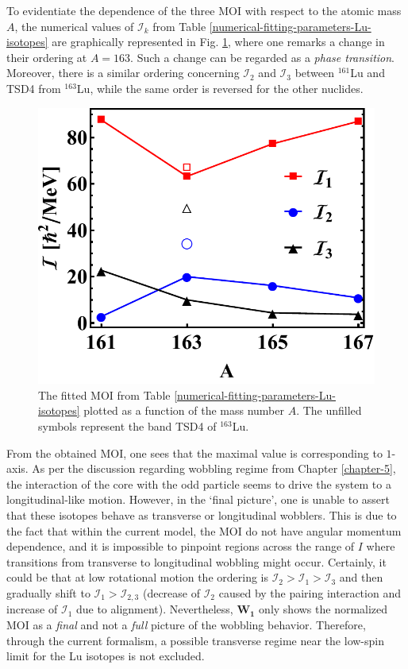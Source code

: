 To evidentiate the dependence of the three MOI with respect to the atomic mass $A$, the numerical values of $\mathcal{I}_k$ from Table \ref{numerical-fitting-parameters-Lu-isotopes} are graphically represented in Fig. \ref{MOIs-A-behavior-Lu-isotopes}, where one remarks a change in their ordering at $A=163$. Such a change can be regarded as a \emph{phase transition}. Moreover, there is a similar ordering concerning $\mathcal{I}_2$ and $\mathcal{I}_3$ between $^{161}$Lu and TSD4 from $^{163}$Lu, while the same order is reversed for the other nuclides.
\begin{figure}
    \centering
    \includegraphics[scale=0.65]{Chapters/Figures/fig1_moivalues.pdf}
    \caption{The fitted MOI from Table \ref{numerical-fitting-parameters-Lu-isotopes} plotted as a function of the mass number $A$. The unfilled symbols represent the band TSD4 of $^{163}$Lu.}
    \label{MOIs-A-behavior-Lu-isotopes}
\end{figure}

From the obtained MOI, one sees that the maximal value is corresponding to $1$-axis. As per the discussion regarding wobbling regime from Chapter \ref{chapter-5}, the interaction of the core with the odd particle seems to drive the system to a longitudinal-like motion. However, in the `final picture', one is unable to assert that these isotopes behave as transverse or longitudinal wobblers. This is due to the fact that within the current model, the MOI do not have angular momentum dependence, and it is impossible to pinpoint regions across the range of $I$ where transitions from transverse to longitudinal wobbling might occur. Certainly, it could be that at low rotational motion the ordering is $\mathcal{I}_2>\mathcal{I}_1>\mathcal{I}_3$ and then gradually shift to $\mathcal{I}_1>\mathcal{I}_{2,3}$ (decrease of $\mathcal{I}_2$ caused by the pairing interaction and increase of $\mathcal{I}_1$ due to alignment). Nevertheless, $\mathbf{W_1}$ only shows the normalized MOI as a \emph{final} and not a \emph{full} picture of the wobbling behavior. Therefore, through the current formalism, a possible transverse regime near the low-spin limit for the Lu isotopes is not excluded.

